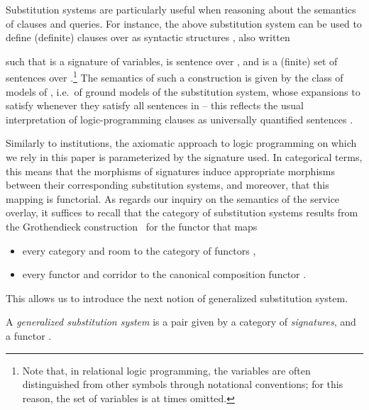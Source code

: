 \documentclass{LMCS}
\begin{document}
  Substitution systems are particularly useful when reasoning about the semantics of clauses and queries.
  For instance, the above substitution system can be used to define (definite) clauses over  as syntactic structures , also written
  
  such that  is a signature of variables,  is sentence over , and  is a (finite) set of sentences over .\footnote{Note that, in relational logic programming, the variables are often distinguished from other symbols through notational conventions; for this reason, the set  of variables is at times omitted.}
  The semantics of such a construction is given by the class of models of , i.e.\ of ground models of the substitution system, whose expansions to  satisfy  whenever they satisfy all sentences in  -- this reflects the usual interpretation of logic-programming clauses as universally quantified sentences .

  Similarly to institutions, the axiomatic approach to logic programming on which we rely in this paper is parameterized by the signature used.
  In categorical terms, this means that the morphisms of signatures induce appropriate morphisms between their corresponding substitution systems, and moreover, that this mapping is functorial.
  As regards our inquiry on the semantics of the service overlay, it suffices to recall that the category  of substitution systems results from the Grothendieck construction~\cite{Tarlecki-Burstall-Goguen:Fundamental-algebraic-tools-III-1991} for the functor  that maps
  \begin{itemize}

  \item every category  and room  to the category of functors ,

  \item every functor  and corridor  to the canonical composition functor 
    .

  \end{itemize}
  This allows us to introduce the next notion of generalized substitution system.

  \begin{defi}
    A \emph{generalized substitution system} is a pair  given by a category  of \emph{signatures}, and a functor .
  \end{defi}
\end{document}
